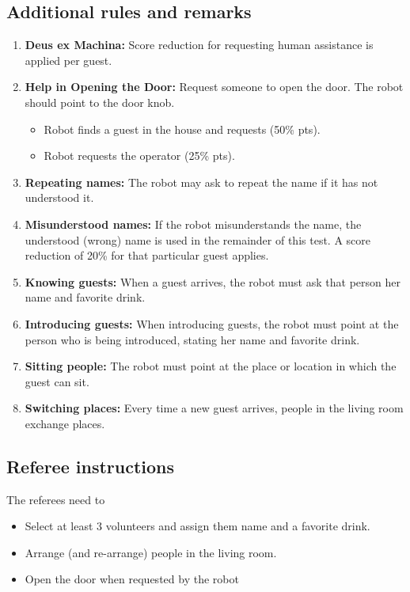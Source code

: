 \subsection{Additional rules and remarks}
\begin{enumerate}[nosep]
	\item \textbf{Deus ex Machina:} Score reduction for requesting human assistance is applied per guest.
	
	\item \textbf{Help in Opening the Door:} Request someone to open the door. The robot should point to the door knob.
	\begin{itemize}
		\item 	Robot finds a guest in the house and requests (50\% pts).
		\item  	Robot requests the operator (25\% pts).
	\end{itemize}

	\item \textbf{Repeating names:} The robot may ask to repeat the name if it has not understood it.
	
	\item \textbf{Misunderstood names:} If the robot misunderstands the name, the understood (wrong) name is used in the remainder of this test.
	A score reduction of 20\%  for that particular guest applies.
	
	\item \textbf{Knowing guests:} When a guest arrives, the robot must ask that person her name and favorite drink.

	\item \textbf{Introducing guests:} When introducing guests, the robot must point at the person who is being introduced, stating her name and favorite drink.

	\item \textbf{Sitting people:} The robot must point at the place or location in which the guest can sit.

	\item \textbf{Switching places:} Every time a new guest arrives, people in the living room exchange places.
\end{enumerate}


\subsection{Referee instructions}

The referees need to
\begin{itemize}
	\item Select at least 3 volunteers and assign them name and a favorite drink.
	\item Arrange (and re-arrange) people in the living room.
	\item Open the door when requested by the robot
\end{itemize}

